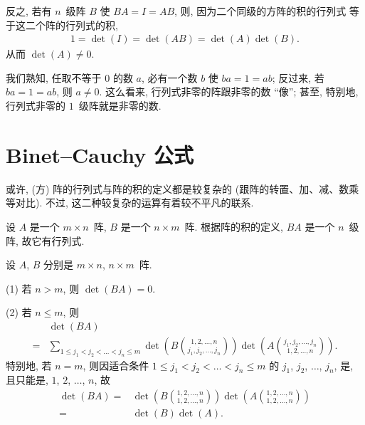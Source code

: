 反之, 若有 \(n\)~级阵 \(B\) 使 \(BA = I = AB\),
则,
因为二个同级的方阵的积的行列式%
等于这二个阵的行列式的积,
\begin{align*}
    1 = \det {(I)} = \det {(AB)} = \det {(A)} \det {(B)}.
\end{align*}
从而 \(\det {(A)} \neq 0\).

我们熟知, 任取不等于 \(0\) 的数 \(a\),
必有一个数 \(b\) 使 \(ba = 1 = ab\);
反过来, 若 \(ba = 1 = ab\), 则 \(a \neq 0\).
这么看来,
行列式非零的阵跟非零的数 ``像'';
甚至, 特别地,
行列式非零的 \(1\)~级阵就是非零的数.



\KunAsteriskoEnEnhavtabelo
\section{Binet--Cauchy 公式}
\SenAsteriskoEnEnhavtabelo

\maldevigalegajxo

或许, (方) 阵的行列式与阵的积的定义都是较复杂的
(跟阵的转置、加、减、数乘等对比).
不过, 这二种较复杂的运算有着较不平凡的联系.

设 \(A\) 是一个 \(m \times n\)~阵,
\(B\) 是一个 \(n \times m\)~阵.
根据阵的积的定义,
\(BA\) 是一个 \(n\)~级阵,
故它有行列式.

\begin{theorem}
    设 \(A\), \(B\) 分别是 \(m \times n\), \(n \times m\)~阵.

    (1)
    若 \(n > m\), 则 \(\det {(BA)} = 0\).

    (2)
    若 \(n \leq m\),
    则
    \begin{align*}
             & \det {(BA)}
        \\
        = {} & \sum_{1 \leq j_1 < j_2 < \dots < j_n \leq m}
        {
            \det {\left(
                B\binom{1, 2, \dots, n}{j_1, j_2, \dots, j_n}
                \right)}
            \det {\left(
                A\binom{j_1, j_2, \dots, j_n}{1, 2, \dots, n}
                \right)}
        }.
    \end{align*}
    特别地, 若 \(n = m\), 则因适合条件
    \(1 \leq j_1 < j_2 < \dots < j_n \leq m\)
    的 \(j_1\), \(j_2\), \(\dots\), \(j_n\),
    是, 且只能是,
    \(1\), \(2\), \(\dots\), \(n\),
    故
    \begin{align*}
        \det {(BA)}
        = {} &
        \det {\left(
            B\binom{1, 2, \dots, n}{1, 2, \dots, n}
            \right)}
        \det {\left(
            A\binom{1, 2, \dots, n}{1, 2, \dots, n}
            \right)}
        \\
        = {} & \det {(B)} \det {(A)}.
    \end{align*}
\end{theorem}

